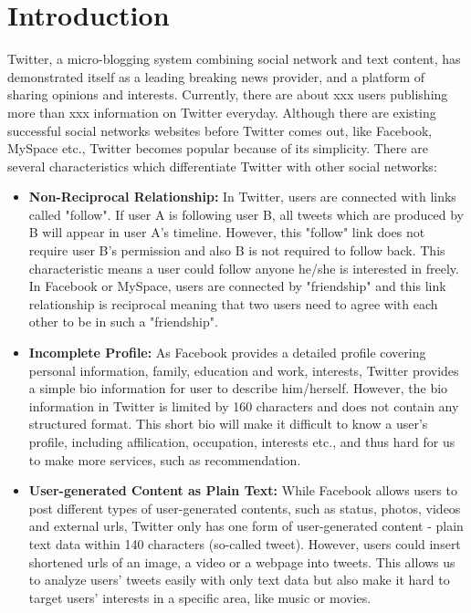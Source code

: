 \section{Introduction}

Twitter, a micro-blogging system combining social network and text content, has demonstrated itself as a leading breaking news provider, and a platform of sharing opinions and interests. Currently, there are about xxx users publishing more than xxx information on Twitter everyday. Although there are existing successful social networks websites before Twitter comes out, like Facebook, MySpace etc., Twitter becomes popular because of its simplicity. There are several characteristics which differentiate Twitter with other social networks:

\begin{itemize}

\item \textbf{Non-Reciprocal Relationship: } In Twitter, users are connected with links called "follow". If user A is following user B, all tweets which are produced by B will appear in user A's timeline. However, this "follow" link does not require user B's permission and also B is not required to follow back. This characteristic means a user could follow anyone he/she is interested in freely. In Facebook or MySpace, users are connected by "friendship" and this link relationship is reciprocal meaning that two users need to agree with each other to be in such a "friendship".

\item \textbf{Incomplete Profile: } As Facebook provides a detailed profile covering personal information, family, education and work, interests, Twitter provides a simple bio information for user to describe him/herself. However, the bio information in Twitter is limited by 160 characters and does not contain any structured format. This short bio will make it difficult to know a user's profile, including affilication, occupation, interests etc., and thus hard for us to make more services, such as recommendation. 

\item \textbf{User-generated Content as Plain Text: } While Facebook allows users to post different types of user-generated contents, such as status, photos, videos and external urls, Twitter only has one form of user-generated content - plain text data within 140 characters (so-called tweet). However, users could insert shortened urls of an image, a video or a webpage into tweets. This allows us to analyze users' tweets easily with only text data but also make it hard to target users' interests in a specific area, like music or movies. 

\end{itemize}

